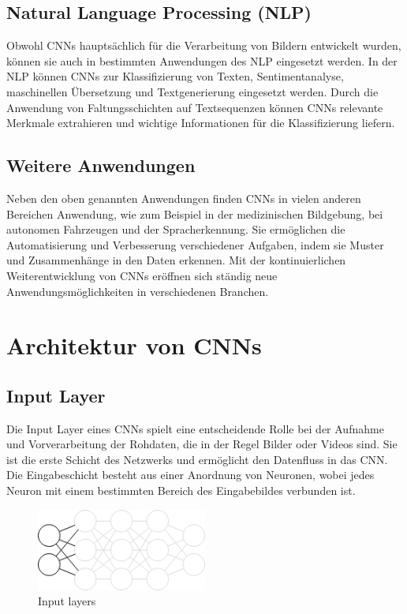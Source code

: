 \subsection{Natural Language Processing (NLP)}

	Obwohl \acp{CNN} hauptsächlich für die Verarbeitung von Bildern entwickelt wurden, können sie auch in bestimmten Anwendungen des \acf{NLP} eingesetzt werden.
	In der \acf{NLP} können \acp{CNN} zur Klassifizierung von Texten, Sentimentanalyse, maschinellen Übersetzung und Textgenerierung eingesetzt werden.
	Durch die Anwendung von Faltungsschichten auf Textsequenzen können \acp{CNN} relevante Merkmale extrahieren und wichtige Informationen für die Klassifizierung liefern.

\subsection{Weitere Anwendungen}

	Neben den oben genannten Anwendungen finden \acp{CNN} in vielen anderen Bereichen Anwendung, wie zum Beispiel in der medizinischen Bildgebung, bei autonomen Fahrzeugen und der Spracherkennung.
	Sie ermöglichen die Automatisierung und Verbesserung verschiedener Aufgaben, indem sie Muster und Zusammenhänge in den Daten erkennen.
	Mit der kontinuierlichen Weiterentwicklung von \acp{CNN} eröffnen sich ständig neue Anwendungsmöglichkeiten in verschiedenen Branchen.

\section{Architektur von CNNs}

\subsection{Input Layer}

    Die Input Layer eines \acfp{CNN} spielt eine entscheidende Rolle bei der Aufnahme und Vorverarbeitung der Rohdaten, die in der Regel Bilder oder Videos sind. 
    Sie ist die erste Schicht des Netzwerks und ermöglicht den Datenfluss in das \ac{CNN}.
    Die Eingabeschicht besteht aus einer Anordnung von Neuronen, wobei jedes Neuron mit einem bestimmten Bereich des Eingabebildes verbunden ist. 

    \begin{figure}[h]
        \centering
        \includegraphics[width=0.5\textwidth]{img/input_layers.png}
        \caption{Input layers}
        \label{fig:input_layers}
    \end{figure}
    
